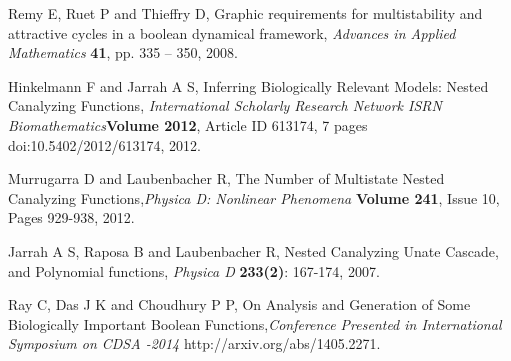 \documentclass{article}
\begin{document}
\begin{thebibliography}{1}
   Remy E, Ruet P and Thieffry D, Graphic requirements for multistability and attractive cycles in a boolean dynamical framework, {\it Advances in Applied Mathematics} {\bf 41}, pp. 335 – 350, 2008.
  
   Hinkelmann F and Jarrah A S, Inferring Biologically Relevant Models: Nested Canalyzing Functions, {\it International Scholarly Research Network ISRN Biomathematics}{\bf  Volume 2012}, Article ID 613174, 7 pages doi:10.5402/2012/613174, 2012.
  
   Murrugarra D and Laubenbacher R, The Number of Multistate Nested Canalyzing Functions,{\it  Physica D: Nonlinear Phenomena} {\bf Volume 241}, Issue 10, Pages 929-938, 2012.
  
  	Jarrah A S, Raposa B and Laubenbacher R, Nested Canalyzing Unate Cascade, and Polynomial functions, {\it Physica D} {\bf 233(2)}: 167-174, 2007.
  
   Ray C, Das J K and Choudhury P P, On Analysis and Generation of Some Biologically Important Boolean Functions,{\it  Conference Presented in International Symposium on CDSA -2014} http://arxiv.org/abs/1405.2271.
  
\end{thebibliography}
\end{document}
